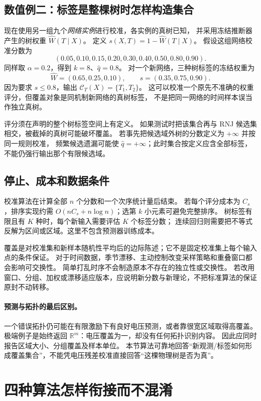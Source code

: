 \subsection{数值例二：标签是整棵树时怎样构造集合}

现在使用另一组九个\emph{网络实例}进行校准，各实例的真树已知，
并采用冻结推断器产生的树权重 $\widehat W(T\mid X)$。
定义 $s(X,T)=1-\widehat W(T\mid X)$。
假设这组网络校准分数为
\[
 (0.05,0.10,0.15,0.20,0.30,0.40,0.50,0.80,0.90).
\]
同样取 $\alpha=0.2$，得到 $k=8$、$\widehat q=0.8$。
对一个新网络，三种树标签的冻结权重为
\[
 \widehat W=(0.65,0.25,0.10),\qquad s=(0.35,0.75,0.90).
\]
因为要求 $s\le0.8$，输出
$\mathcal C_T(X)=\{T_1,T_2\}$。
这可以校准一个原先不准确的权重评分，但覆盖对象是同机制新网络的真树标签，
不是把同一网络的时间样本误当作独立真树。

评分须在声明的整个树标签空间上有定义。
如果测试时把该集合再与 RNJ 候选集相交，被截掉的真树可能破坏覆盖。
若事先把候选域外树的分数定义为 $+\infty$ 并按同一规则校准，
频繁候选遗漏可能使 $\widehat q=+\infty$；此时集合按定义应含全部标签，
不能仍强行输出那个有限候选域。

\subsection{停止、成本和数据条件}

校准算法在计算全部 $n$ 个分数和一个次序统计量后结束。
若每个评分成本为 $C_s$，排序实现约需
$O(nC_s+n\log n)$；选第 $k$ 小元素可避免完整排序。
树标签有限且有 $K$ 种时，每个新输入需要评估 $K$ 个标签分数；
连续回归则需要把不等式反解为区间或区域。这里不包含预测器训练成本。

覆盖是对校准集和新样本随机性平均后的边际陈述；它不是固定校准集上每个输入点的条件保证。
对于时间数据，季节漂移、主动控制改变采样策略和重叠窗口都会影响可交换性。
简单打乱时序不会制造原本不存在的独立性或交换性。
若改用窗口、分组、加权或漂移适应版本，应说明新分数与新理论，不把标准算法的保证原封不动转移。

\paragraph{预测与拓扑的最后区别。}
一个错误拓扑仍可能在有限激励下有良好电压预测，或者靠很宽区域取得高覆盖。
极端例子是始终返回 $\mathbb R^m$：电压覆盖为一，却没有任何拓扑识别内容。
因此应同时报告区域大小、分组覆盖及样本单位。
本节算法可靠地回答“新观测/标签如何形成覆盖集合”，不能凭电压残差校准直接回答“这棵物理树是否为真”。

\section{四种算法怎样衔接而不混淆}
\label{sec:textbook-statistical-connection}

